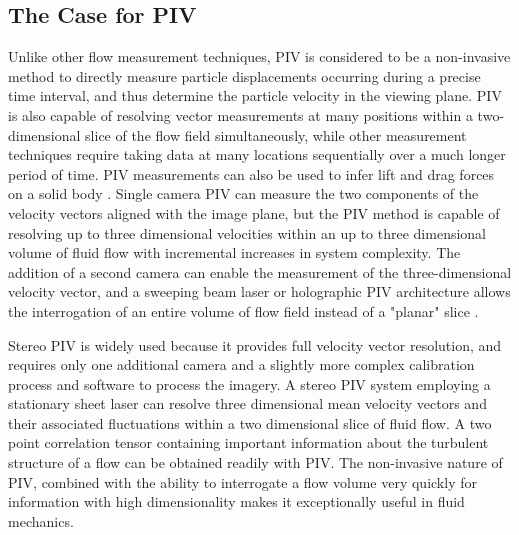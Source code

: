  
\subsection{The Case for PIV}

Unlike other flow measurement techniques, PIV is considered to be a 
non-invasive method to directly measure particle displacements occurring during 
a precise time interval, and thus determine the particle velocity in the 
viewing plane. PIV is also capable 
of resolving vector measurements at many positions within a two-dimensional 
slice of the flow field simultaneously, while other measurement techniques 
require taking data at many locations sequentially over a much longer period 
of time. PIV measurements can also be used to infer lift and drag forces on a 
solid body \cite{noca1997}. Single camera PIV can measure the two components of 
the velocity vectors aligned with the image plane, but the PIV method is 
capable of resolving up to three dimensional velocities within an up to three 
dimensional volume of fluid flow with incremental increases 
in system complexity. The addition of a second camera can enable the 
measurement of the three-dimensional velocity vector, and a sweeping beam laser 
or holographic PIV architecture allows the interrogation of an entire volume of 
flow field instead of a "planar" slice 
\cite{barnhart1994,elsinga2006,kahler2000}.

Stereo PIV is widely used because it provides full velocity vector resolution, 
and requires only one additional camera and a slightly more complex 
calibration process and software to process the imagery. A stereo PIV system 
employing a  stationary sheet laser can resolve three dimensional mean velocity 
vectors and their associated fluctuations within a two dimensional slice of 
fluid flow. A 
two point correlation tensor containing important information about the 
turbulent structure of a flow can be obtained readily with PIV. The 
non-invasive nature of PIV, combined with the  ability to interrogate a flow 
volume very quickly for information with high dimensionality makes it 
exceptionally useful in fluid mechanics. \cite{adrian1991}

